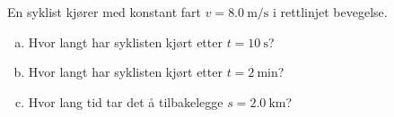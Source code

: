 %
En syklist kjører med konstant fart $v = \SI{8.0}{\metre\per\second}$ i rettlinjet bevegelse.
\begin{enumerate}[a)]
    \item Hvor langt har syklisten kjørt etter $t = \SI{10}{\second}$?
    \item Hvor langt har syklisten kjørt etter $t = \SI{2}{\minute}$?
    \item Hvor lang tid tar det å tilbakelegge $s = \SI{2.0}{\kilo\metre}$?
\end{enumerate}
